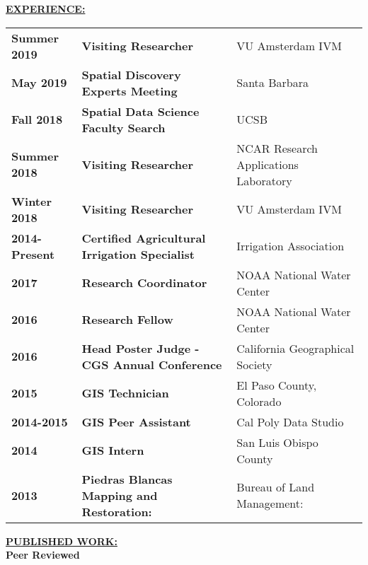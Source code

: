 \documentclass{article}
\newcommand{\header}[1]{\hspace{-5mm}\textcolor{header_blue}{\underline{\textbf{#1}}\\}} %
\newcommand{\subheader}[1]{\hspace{25mm}\textcolor{header_blue}{\textbf{#1}\\}} %
\begin{document}
\header{EXPERIENCE:}
\newline
\vspace{-8mm}
\begin{longtable}{p{2.5cm}p{8.0cm}P{5.0cm}}
  \textbf{Summer 2019 } & \textbf{Visiting Researcher } & VU Amsterdam IVM \\ 
  \textbf{May 2019 } & \textbf{Spatial Discovery Experts Meeting } & Santa Barbara \\ 
  \textbf{Fall 2018 } & \textbf{Spatial Data Science Faculty Search } & UCSB \\ 
  \textbf{Summer 2018 } & \textbf{Visiting Researcher } & NCAR Research Applications Laboratory \\ 
  \textbf{Winter 2018 } & \textbf{Visiting Researcher } & VU Amsterdam IVM \\ 
  \textbf{2014-Present } & \textbf{Certified Agricultural Irrigation Specialist } & Irrigation Association \\ 
  \textbf{2017 } & \textbf{Research Coordinator } & NOAA National Water Center \\ 
  \textbf{2016 } & \textbf{Research Fellow } & NOAA National Water Center \\ 
  \textbf{2016 } & \textbf{Head Poster Judge - CGS Annual Conference } & California Geographical Society \\ 
  \textbf{2015 } & \textbf{GIS Technician } & El Paso County, Colorado \\ 
  \textbf{2014-2015 } & \textbf{GIS Peer Assistant } & Cal Poly Data Studio \\ 
  \textbf{2014 } & \textbf{GIS Intern } & San Luis Obispo County \\ 
  \textbf{2013 } & \textbf{Piedras Blancas Mapping and Restoration: } & Bureau of Land Management: \\ 
  \end{longtable}




\header{PUBLISHED WORK:}
\newline
\subheader{Peer Reviewed}
\end{document}
